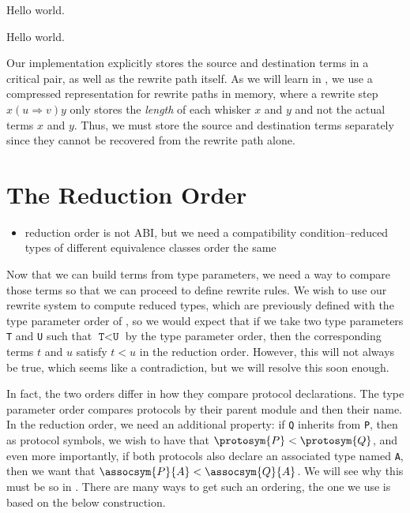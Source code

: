 \documentclass[../generics]{subfiles}
\begin{document}
\begin{algorithm}\label{trie lookup algo}
Hello world.
\end{algorithm}

\begin{algorithm}\label{term reduction trie algo}
Hello world.
\end{algorithm}

Our implementation explicitly stores the source and destination terms in a critical pair, as well as the rewrite path itself. As we will learn in , we use a compressed representation for rewrite paths in memory, where a rewrite step $x(u\Rightarrow v)y$ only stores the \emph{length} of each whisker $x$ and $y$ and not the actual terms $x$ and $y$. Thus, we must store the source and destination terms separately since they cannot be recovered from the rewrite path alone.

\section{The Reduction Order}\label{reduction order}

\begin{itemize}
\item reduction order is not ABI, but we need a compatibility condition--reduced types of different equivalence classes order the same
\end{itemize}

%

Now that we can build terms from type parameters, we need a way to compare those terms so that we can proceed to define rewrite rules. We wish to use our rewrite system to compute reduced types, which are previously defined with the type parameter order of , so we would expect that if we take two type parameters \texttt{T} and \texttt{U} such that $\texttt{T}<\texttt{U}$ by the type parameter order, then the corresponding terms $t$ and $u$ satisfy $t<u$ in the reduction order. However, this will not always be true, which seems like a contradiction, but we will resolve this soon enough.

In fact, the two orders differ in how they compare protocol declarations. The type parameter order compares protocols by their parent module and then their name. In the reduction order, we need an additional property: if \texttt{Q} inherits from \texttt{P}, then as protocol symbols, we wish to have that $\protosym{P}<\protosym{Q}$, and even more importantly, if both protocols also declare an associated type named \texttt{A}, then we want that $\assocsym{P}{A}<\assocsym{Q}{A}$. We will see why this must be so in . There are many ways to get such an ordering, the one we use is based on the below construction.
\end{document}
